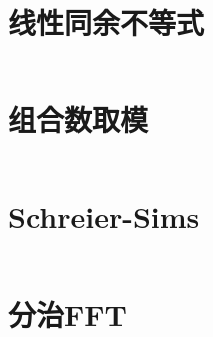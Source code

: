 \section{线性同余不等式}
\inputminted{cpp}{\source/number-theory/linear-inequaltion.cpp}
\section{组合数取模}
\inputminted{cpp}{\source/number-theory/module.cpp}
\section{Schreier-Sims}
\inputminted{cpp}{\source/number-theory/SchreierSims.cpp}
\section{分治FFT}
\inputminted{cpp}{\source/number-theory/cdq-fft.cpp}
